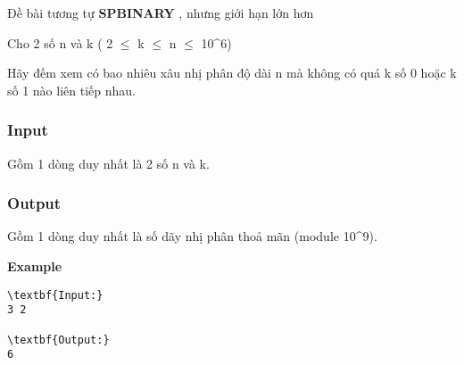



   Đề bài tương tự   \textbf{    SPBINARY   }   , nhưng giới hạn lớn hơn  

   Cho 2 số n và k ( 2 $\le$ k  $\le$  n  $\le$  10\textasciicircum6)  

   Hãy đếm xem có bao nhiêu xâu nhị phân độ dài n mà không có quá k số 0 hoặc k số 1 nào liên tiếp nhau.  

\subsubsection{   Input  }

   Gồm 1 dòng duy nhất là 2 số n và k.  

\subsubsection{   Output  }

   Gồm 1 dòng duy nhất là số dãy nhị phân thoả mãn (module 10\textasciicircum9).  

\textbf{    Example   }
\begin{verbatim}
\textbf{Input:}
3 2

\textbf{Output:}
6\end{verbatim}
